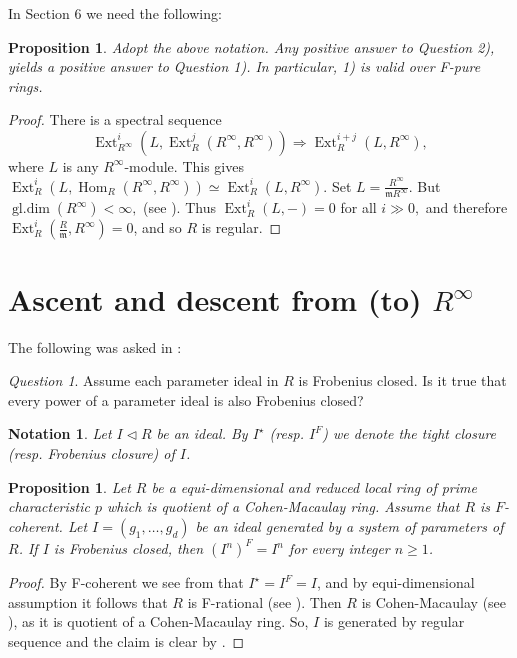 \documentclass[11pt,a4paper]{amsart}
\numberwithin{equation}{section}
\newtheorem{proposition}[theorem]{Proposition}
\newtheorem{notation}[theorem]{Notation}
\theoremstyle{definition}
\theoremstyle{remark}
\newtheorem{question}[theorem]{Question}\newtheorem{discussion}[theorem]{Discussion}
\begin{document}
In Section 6 we need the following:

\begin{proposition}\label{47} Adopt the above notation. Any positive answer to
	Question	2),  yields a positive answer to Question 1). In particular, 1) is valid over F-pure rings.
\end{proposition}
\begin{proof}
	There is a spectral sequence
	\[
	\operatorname{Ext}^{i}_{R^\infty}
	\left(
	L,\operatorname{Ext}^{j}_{R}(R^\infty,R^\infty)
	\right)
	\Longrightarrow
	\operatorname{Ext}^{i+j}_{R}(L,R^\infty),
	\]where $L$ is any $R^\infty$-module.
	This gives 
	$\operatorname{Ext}^{i}_{R}
	\left(
	L,\operatorname{Hom}_{R}(R^\infty,R^\infty)
	\right)
	\simeq
	\operatorname{Ext}^{i}_{R}(L,R^\infty).
	$ Set
	$
	L=\frac{R^\infty}{\mathfrak m R^\infty}.
	$
	But
	$
	\operatorname{gl.dim}(R^\infty)<\infty,
	$ (see \cite{BS1}).	Thus
	$
	\operatorname{Ext}^{i}_{R}(L,-)=0 $
	for all $i\gg0,
	$
	and therefore
	$
	\operatorname{Ext}^{i}_{R}
	\left(
	\frac{R }{\mathfrak m },
	R^\infty
	\right)=0 
	$,  and so $R$ is regular.
\end{proof}	
	\maketitle
	
\section{Ascent and descent from (to) $R^\infty$ }

The following was asked in \cite[Question 3.9]{Al}:
\begin{question} Assume each parameter ideal in $R$ is Frobenius closed. Is it true that every power of a parameter ideal is also Frobenius closed?
\end{question}

\begin{notation}Let $I\lhd R$ be an ideal.
	By $I^\star$ (resp. $I^F$) we denote the tight closure (resp. Frobenius closure) of $I$.
\end{notation}
\begin{proposition}\label{42}
	Let $R$ be a equi-dimensional and reduced local ring of prime characteristic $p$ which is quotient of a Cohen-Macaulay ring.
	Assume that $R$ is $F$-coherent. Let
	$
	I=(g_1,\ldots,g_d)
	$
	be an ideal generated by a system of parameters of $R$. If $I$ is
	Frobenius closed, then
	$
	(I^n)^F=I^n
	$
	for every integer $n\geq 1$.
\end{proposition}
\begin{proof}
	By F-coherent we see from \cite[Proposition 3.11]{Shi10} that $I^\star=I^F=I$, and by equi-dimensional assumption it follows that $R$ is F-rational (see \cite[Proposition 10.3.5]{BH}). Then $R$ is Cohen-Macaulay  (see \cite[Corollary 10.3.4]{BH}), as it is quotient of a Cohen-Macaulay ring. So, $I$ is generated 	by regular sequence and the claim is clear by 
	\cite[Proposition 3.10]{Al}.
\end{proof}
\end{document}
